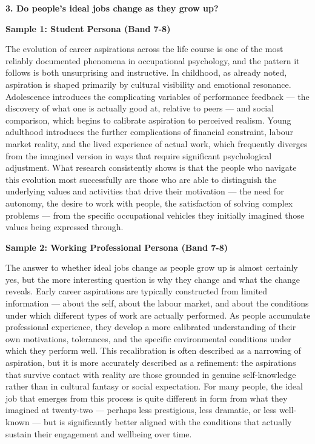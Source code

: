 \separator

\begin{ieltsquestion}
\textbf{3. Do people's ideal jobs change as they grow up?}
\end{ieltsquestion}
\textbf{Sample 1: Student Persona (Band 7-8)}

The evolution of career aspirations across the life course is one of the most reliably documented phenomena in occupational psychology, and the pattern it follows is both unsurprising and instructive. In childhood, as already noted, aspiration is shaped primarily by cultural visibility and emotional resonance. Adolescence introduces the complicating variables of performance feedback — the discovery of what one is actually good at, relative to peers — and social comparison, which begins to calibrate aspiration to perceived realism. Young adulthood introduces the further complications of financial constraint, labour market reality, and the lived experience of actual work, which frequently diverges from the imagined version in ways that require significant psychological adjustment. What research consistently shows is that the people who navigate this evolution most successfully are those who are able to distinguish the underlying values and activities that drive their motivation — the need for autonomy, the desire to work with people, the satisfaction of solving complex problems — from the specific occupational vehicles they initially imagined those values being expressed through.

\textbf{Sample 2: Working Professional Persona (Band 7-8)}

The answer to whether ideal jobs change as people grow up is almost certainly yes, but the more interesting question is why they change and what the change reveals. Early career aspirations are typically constructed from limited information — about the self, about the labour market, and about the conditions under which different types of work are actually performed. As people accumulate professional experience, they develop a more calibrated understanding of their own motivations, tolerances, and the specific environmental conditions under which they perform well. This recalibration is often described as a narrowing of aspiration, but it is more accurately described as a refinement: the aspirations that survive contact with reality are those grounded in genuine self-knowledge rather than in cultural fantasy or social expectation. For many people, the ideal job that emerges from this process is quite different in form from what they imagined at twenty-two — perhaps less prestigious, less dramatic, or less well-known — but is significantly better aligned with the conditions that actually sustain their engagement and wellbeing over time.

